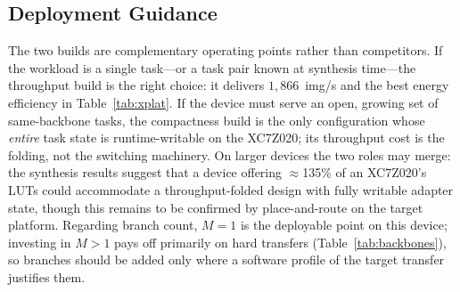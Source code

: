 \documentclass[journal]{IEEEtran}
\begin{document}
\begin{table}[!t]
\centering
\caption{Deployment-level comparison at matched dataset, precision, input size, and batch protocol but different adapter geometries: MARS (FPGA) vs.\ Conv-Adapter (GPU/Jetson), SVHN, batch 1000.}
\label{tab:xplat}
\small
\setlength{\tabcolsep}{3pt}
\end{table}

\subsection{Deployment Guidance}
The two builds are complementary operating points rather than competitors. If the workload is a single task---or a task pair known at synthesis time---the throughput build is the right choice: it delivers $1{,}866$~img/s and the best energy efficiency in Table~\ref{tab:xplat}. If the device must serve an open, growing set of same-backbone tasks, the compactness build is the only configuration whose \emph{entire} task state is runtime-writable on the XC7Z020; its throughput cost is the folding, not the switching machinery. On larger devices the two roles may merge: the synthesis results suggest that a device offering $\approx$135\% of an XC7Z020's LUTs could accommodate a throughput-folded design with fully writable adapter state, though this remains to be confirmed by place-and-route on the target platform. Regarding branch count, $M{=}1$ is the deployable point on this device; investing in $M{>}1$ pays off primarily on hard transfers (Table~\ref{tab:backbones}), so branches should be added only where a software profile of the target transfer justifies them.
\end{document}
